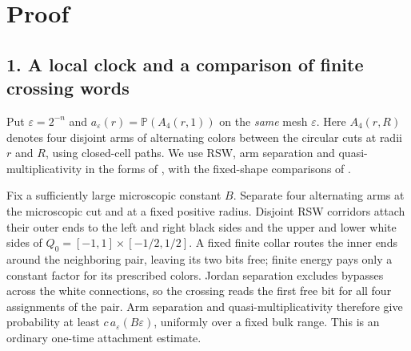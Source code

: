 \documentclass[11pt]{article}
\newcommand{\Pp}{\mathbb P}
\begin{document}
\section{Proof}

\subsection*{1. A local clock and a comparison of finite crossing words}

Put $\varepsilon=2^{-n}$ and
$a_\varepsilon(r)=\Pp(A_4(r,1))$ on the \emph{same} mesh $\varepsilon$.
Here $A_4(r,R)$ denotes four disjoint arms of alternating colors between
the circular cuts at radii $r$ and $R$, using closed-cell paths.
We use RSW, arm separation and quasi-multiplicativity in
the forms of \cite[Sections 2.3 and 4, Propositions 15--16]{Nolin},
with the fixed-shape comparisons of \cite[Section 2]{OAI}.

Fix a sufficiently large microscopic constant $B$. Separate four
alternating arms at the microscopic cut and at a fixed positive radius.
Disjoint RSW corridors attach their outer ends to the left and right
black sides and the upper and lower white sides of
$Q_0=[-1,1]\times[-1/2,1/2]$. A fixed finite collar routes the inner
ends around the neighboring pair, leaving its two bits free; finite
energy pays only a constant factor for its prescribed colors.
Jordan separation \cite[Section 4.1]{Diestel} excludes bypasses across
the white connections, so the crossing reads the first free bit for all
four assignments of the pair. Arm separation and
quasi-multiplicativity therefore give probability at least
$c\,a_\varepsilon(B\varepsilon)$, uniformly over a fixed bulk range.
This is an ordinary one-time attachment estimate.
\end{document}

